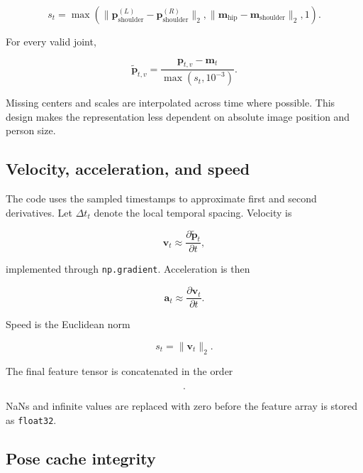 \documentclass[11pt,a4paper]{article}
\newcommand{\code}[1]{\texttt{#1}}
\begin{document}
\begin{equation}
s_t
=
\max
\left(
\lVert
\mathbf{p}^{(L)}_{\mathrm{shoulder}}
-
\mathbf{p}^{(R)}_{\mathrm{shoulder}}
\rVert_2,
\lVert
\mathbf{m}_{\mathrm{hip}}
-
\mathbf{m}_{\mathrm{shoulder}}
\rVert_2,
1
\right).
\end{equation}

For every valid joint,

\begin{equation}
\widetilde{\mathbf{p}}_{t,v}
=
\frac{
\mathbf{p}_{t,v}-\mathbf{m}_t
}{
\max(s_t,10^{-3})
}.
\end{equation}

Missing centers and scales are interpolated across time where possible. This design makes the representation less dependent on absolute image position and person size.

\subsection{Velocity, acceleration, and speed}

The code uses the sampled timestamps to approximate first and second derivatives. Let $\Delta t_t$ denote the local temporal spacing. Velocity is

\begin{equation}
\mathbf{v}_t
\approx
\frac{
\partial \widetilde{\mathbf{p}}_t
}{
\partial t
},
\end{equation}

implemented through \code{np.gradient}. Acceleration is then

\begin{equation}
\mathbf{a}_t
\approx
\frac{
\partial \mathbf{v}_t
}{
\partial t
}.
\end{equation}

Speed is the Euclidean norm

\begin{equation}
s_t
=
\lVert
\mathbf{v}_t
\rVert_2.
\end{equation}

The final feature tensor is concatenated in the order

\begin{equation}
[x,y,c,v_x,v_y,a_x,a_y,s].
\end{equation}

NaNs and infinite values are replaced with zero before the feature array is stored as \code{float32}.

\subsection{Pose cache integrity}
\end{document}
